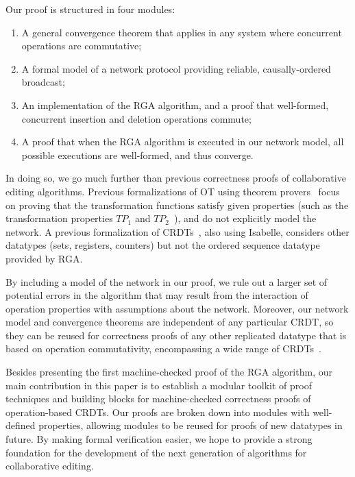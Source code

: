 \documentclass[acmlarge,review,anonymous]{acmart}\settopmatter{printfolios=true}
\begin{document}
Our proof is structured in four modules:
\begin{enumerate}
    \item A general convergence theorem that applies in any system where concurrent operations are
        commutative;
    \item A formal model of a network protocol providing reliable, causally-ordered broadcast;
    \item An implementation of the RGA algorithm, and a proof that well-formed, concurrent insertion
        and deletion operations commute;
    \item A proof that when the RGA algorithm is executed in our network model, all possible
        executions are well-formed, and thus converge.
\end{enumerate}

In doing so, we go much further than previous correctness proofs of collaborative editing
algorithms. Previous formalizations of OT using theorem
provers~\cite{Imine:2003ks,Imine:2006kn,Sinchuk:2016cf,Jungnickel:2015ua} focus on proving that the
transformation functions satisfy given properties (such as the transformation properties
$\mathit{TP}_1$ and $\mathit{TP}_2$~\cite{Oster:2006tr,Ressel:1996wx}), and do not explicitly model
the network. A previous formalization of CRDTs~\cite{Zeller:2014fl}, also using Isabelle, considers
other datatypes (sets, registers, counters) but not the ordered sequence datatype provided by RGA.

By including a model of the network in our proof, we rule out a larger set of potential errors in
the algorithm that may result from the interaction of operation properties with assumptions about
the network. Moreover, our network model and convergence theorems are independent of any particular
CRDT, so they can be reused for correctness proofs of any other replicated datatype that is based on
operation commutativity, encompassing a wide range of CRDTs~\cite{Baquero:2014ed}.

Besides presenting the first machine-checked proof of the RGA algorithm, our main contribution in
this paper is to establish a modular toolkit of proof techniques and building blocks for
machine-checked correctness proofs of operation-based CRDTs. Our proofs are broken down into modules
with well-defined properties, allowing modules to be reused for proofs of new datatypes in future.
By making formal verification easier, we hope to provide a strong foundation for the development of
the next generation of algorithms for collaborative editing.
\end{document}
